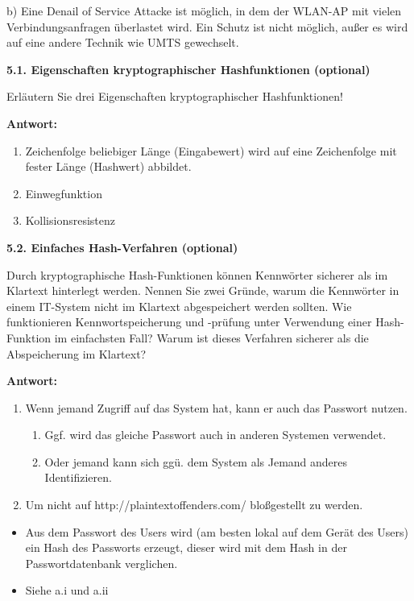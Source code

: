 \documentclass[ngerman]{fbi-aufgabenblatt}
\begin{document}
b) Eine Denail of Service Attacke ist möglich, in dem der WLAN-AP mit vielen Verbindungsanfragen überlastet wird. Ein Schutz ist nicht möglich, außer es wird auf eine andere Technik wie UMTS gewechselt. 


\newpage
{}

\textbf{5.1. Eigenschaften kryptographischer Hashfunktionen (optional)}

Erläutern Sie drei Eigenschaften kryptographischer Hashfunktionen!

\textbf{Antwort:}
    \begin{enumerate}
    \item Zeichenfolge beliebiger Länge (Eingabewert) wird auf eine Zeichenfolge mit fester Länge (Hashwert) abbildet.
    \item Einwegfunktion
    \item Kollisionsresistenz
    \end{enumerate}

\textbf{5.2. Einfaches Hash-Verfahren (optional)}

Durch kryptographische Hash-Funktionen können Kennwörter sicherer als im Klartext hinterlegt werden. Nennen Sie zwei Gründe, warum die Kennwörter in einem IT-System nicht im Klartext abgespeichert werden sollten. Wie funktionieren Kennwortspeicherung und -prüfung unter Verwendung einer Hash-Funktion im einfachsten Fall? Warum ist dieses Verfahren sicherer als die Abspeicherung im Klartext?

\textbf{Antwort:}
   \begin{enumerate}
    \item Wenn jemand Zugriff auf das System hat, kann er auch das Passwort nutzen. 
    \begin{enumerate}
    \item Ggf. wird das gleiche Passwort auch in anderen Systemen verwendet.
    \item Oder jemand kann sich ggü. dem System als Jemand anderes Identifizieren.
    \end{enumerate}
    \item Um nicht auf http://plaintextoffenders.com/ bloßgestellt zu werden.
    \end{enumerate} 
    
    \begin{itemize}
    \item Aus dem Passwort des Users wird (am besten lokal auf dem Gerät des Users) ein Hash des Passworts erzeugt, dieser wird mit dem Hash in der Passwortdatenbank verglichen.
    \item Siehe a.i und a.ii
    \end{itemize}
\end{document}
